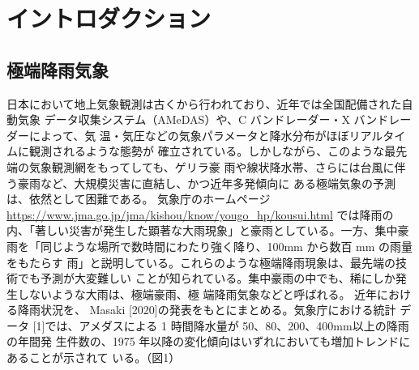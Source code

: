 \section{イントロダクション}
\subsection{極端降雨気象}
日本において地上気象観測は古くから行われており、近年では全国配備された自動気象
データ収集システム（AMeDAS）や、C バンドレーダー・X バンドレーダーによって、気
温・気圧などの気象パラメータと降水分布がほぼリアルタイムに観測されるような態勢が
確立されている。しかしながら、このような最先端の気象観測網をもってしても、ゲリラ豪
雨や線状降水帯、さらには台風に伴う豪雨など、大規模災害に直結し、かつ近年多発傾向に
ある極端気象の予測は、依然として困難である。
気象庁のホームページ\url{https://www.jma.go.jp/jma/kishou/know/yougo_hp/kousui.html}
では降雨の内、「著しい災害が発生した顕著な大雨現象」と豪雨としている。一方、集中豪
雨を「同じような場所で数時間にわたり強く降り、100mm から数百 mm の雨量をもたらす
雨」と説明している。これらのような極端降雨現象は、最先端の技術でも予測が大変難しい
ことが知られている。集中豪雨の中でも、稀にしか発生しないような大雨は、極端豪雨、極
端降雨気象などと呼ばれる。
近年における降雨状況を、 Masaki [2020]の発表をもとにまとめる。気象庁における統計
データ [1]では、アメダスによる 1 時間降水量が 50、80、200、400mm以上の降雨の年間発
生件数の、1975 年以降の変化傾向はいずれにおいても増加トレンドにあることが示されて
いる。（図1）

